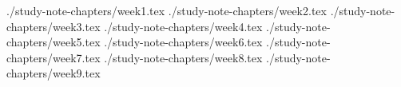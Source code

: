 \documentclass[10pt,a4paper,oneside]{report}
\begin{document}
\maketitle

\setcounter{tocdepth}{5}
\tableofcontents

 {./study-note-chapters/week1.tex}
 {./study-note-chapters/week2.tex}
 {./study-note-chapters/week3.tex}
 {./study-note-chapters/week4.tex}
 {./study-note-chapters/week5.tex}
 {./study-note-chapters/week6.tex}
 {./study-note-chapters/week7.tex}
 {./study-note-chapters/week8.tex}
 {./study-note-chapters/week9.tex}
\end{document}
